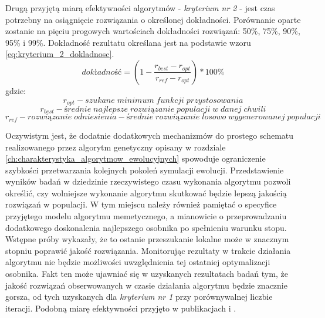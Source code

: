 \par
Drugą przyjętą miarą efektywności algorytmów - \emph{kryterium nr 2} - jest czas potrzebny na osiągnięcie rozwiązania o określonej dokładności. Porównanie oparte zostanie na pięciu progowych wartościach dokładności rozwiązań: 50\%, 75\%, 90\%, 95\% i 99\%. Dokładność rezultatu określana jest na podstawie wzoru \ref{eq:kryterium_2_dokladnosc}. 
\begin{equation} \label{eq:kryterium_2_dokladnosc}
dokładność = \left(1-\frac{r_{best}-r_{opt}}{r_{ref}-r_{opt}}\right)*100\%
\end{equation}
gdzie:
\[r_{opt} - szukane\; minimum\; funkcji\; przystosowania\]
\[r_{best} - średnie\; najlepsze\; rozwiązanie\; populacji\; w\; danej\; chwili\]
\[r_{ref} - rozwiązanie\; odniesienia - średnie\; rozwiązanie\; losowo\; wygenerowanej\; populacji\]

\par
Oczywistym jest, że dodatnie dodatkowych mechanizmów do prostego schematu realizowanego przez algorytm genetyczny opisany w rozdziale \ref{ch:charakterystyka_algorytmow_ewolucyjnych} spowoduje ograniczenie szybkości przetwarzania kolejnych pokoleń symulacji ewolucji. Przedstawienie wyników badań w dziedzinie rzeczywistego czasu wykonania algorytmu pozwoli określić, czy wolniejsze wykonanie algorytmu skutkować będzie lepszą jakością rozwiązań w populacji. W tym miejscu należy również pamiętać o specyfice przyjętego modelu algorytmu memetycznego, a mianowicie o przeprowadzaniu dodatkowego doskonalenia najlepszego osobnika po spełnieniu warunku stopu. Wstępne próby wykazały, że to ostanie przeszukanie lokalne może w znacznym stopniu poprawić jakość rozwiązania. Monitorując rezultaty w trakcie działania algorytmu nie będzie możliwości uwzględnienia tej ostatniej optymalizacji osobnika. Fakt ten może ujawniać się w uzyskanych rezultatach badań tym, że jakość rozwiązań obserwowanych w czasie działania algorytmu będzie znacznie gorsza, od tych uzyskanych dla \emph{kryterium nr 1} przy porównywalnej liczbie iteracji. Podobną miarę efektywności przyjęto w publikacjach \cite{elbeltagi2005comparison} i \cite{mullen2014continuous}.


